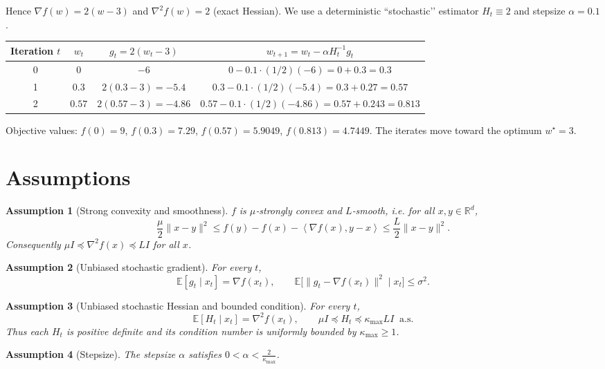 \documentclass{article}
\newtheorem{assumption}{Assumption}
\newcommand{\E}{\mathbb{E}}
\newcommand{\ip}[2]{\left\langle #1,#2\right\rangle}
\newcommand{\R}{\mathbb{R}}
\newcommand{\grad}{\nabla}
\begin{document}
Hence $\grad f(w)=2(w-3)$ and $\nabla^2 f(w)=2$ (exact Hessian).  
We use a deterministic “stochastic’’ estimator $H_t\equiv 2$ and stepsize $\alpha=0.1$.

\begin{center}
\begin{tabular}{c c c c}
\toprule
Iteration $t$ & $w_t$ & $g_t=2(w_t-3)$ & $w_{t+1}=w_t-\alpha H_t^{-1}g_t$ \\
\midrule
0 & $0$ & $-6$ & $0-0.1\cdot(1/2)(-6)=0+0.3=0.3$ \\
1 & $0.3$ & $2(0.3-3)=-5.4$ & $0.3-0.1\cdot(1/2)(-5.4)=0.3+0.27=0.57$ \\
2 & $0.57$ & $2(0.57-3)=-4.86$ & $0.57-0.1\cdot(1/2)(-4.86)=0.57+0.243=0.813$ \\
\bottomrule
\end{tabular}
\end{center}
Objective values: $f(0)=9$, $f(0.3)=7.29$, $f(0.57)=5.9049$, $f(0.813)=4.7449$.  
The iterates move toward the optimum $w^\star=3$.

\newpage
\section*{Assumptions}
\begin{assumption}[Strong convexity and smoothness]\label{as:sc}
$f$ is $\mu$‑strongly convex and $L$‑smooth, i.e. for all $x,y\in\R^d$,
\[
\frac{\mu}{2}\|x-y\|^2\le f(y)-f(x)-\ip{\grad f(x)}{y-x}\le
\frac{L}{2}\|x-y\|^2 .
\tag{2}
\]
Consequently $ \mu I \preceq \nabla^2 f(x) \preceq L I$ for all $x$.
\end{assumption}

\begin{assumption}[Unbiased stochastic gradient]\label{as:grad}
For every $t$, 
\[
\E[g_t\mid x_t]=\grad f(x_t),\qquad 
\E\big[\|g_t-\grad f(x_t)\|^2\mid x_t\big]\le\sigma^2 .
\tag{3}
\]
\end{assumption}

\begin{assumption}[Unbiased stochastic Hessian and bounded condition]\label{as:hess}
For every $t$, 
\[
\E[H_t\mid x_t]=\nabla^2 f(x_t),\qquad
\mu I \preceq H_t \preceq \kappa_{\max} L I\;\; \text{a.s.}
\tag{4}
\]
Thus each $H_t$ is positive definite and its condition number is uniformly bounded by $\kappa_{\max}\ge 1$.
\end{assumption}

\begin{assumption}[Stepsize]\label{as:step}
The stepsize $\alpha$ satisfies $0<\alpha<\frac{2}{\kappa_{\max}}$.
\end{assumption}
\end{document}
